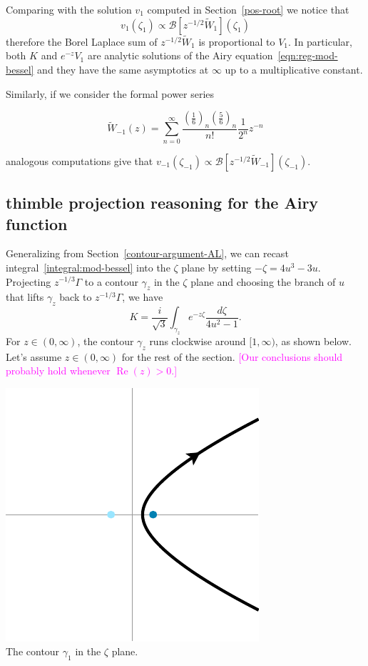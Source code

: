\documentclass{article}
\theoremstyle{definition}
\newcommand{\borel}{\mathcal{B}}
\begin{document}
Comparing with the solution $v_1$ computed in Section~\ref{pos-root} we notice that \[v_1(\zeta_1)\propto \borel\left[z^{-1/2}\tilde{W}_1\right](\zeta_1)\]
therefore the Borel Laplace sum of $z^{-1/2}\tilde{W}_1$ is proportional to $V_1$. In particular, both $K$ and $e^{-z}V_1$ are analytic solutions of the Airy equation~\eqref{eqn:reg-mod-bessel} and they have the same asymptotics at $\infty$ up to a multiplicative constant. 

Similarly, if we consider the formal power series

\begin{equation}
\tilde{W}_{-1}(z)=\sum_{n=0}^{\infty}\frac{\left(\frac{1}{6}\right)_n\left(\frac{5}{6}\right)_n}{n!}\frac{1}{2^n}z^{-n}
\end{equation}

analogous computations give that $v_{-1}(\zeta_{-1})\propto\borel\left[z^{-1/2}\tilde{W}_{-1}\right](\zeta_{-1})$.

\subsection{thimble projection reasoning for the Airy function}\label{contour-argument}
Generalizing from Section~\ref{contour-argument-AL}, we can recast integral~\eqref{integral:mod-bessel} into the $\zeta$ plane by setting $-\zeta = 4u^3 - 3u$. Projecting $z^{-1/3} \Gamma$ to a contour $\gamma_z$ in the $\zeta$ plane and choosing the branch of $u$ that lifts $\gamma_z$ back to $z^{-1/3} \Gamma$, we have
\begin{equation}\label{integral:mod-bessel-zeta}
K = \frac{i}{\sqrt{3}} \int_{\gamma_z} e^{-z\zeta}\frac{d\zeta}{4u^2 - 1}.
\end{equation}
For $z \in (0, \infty)$, the contour $\gamma_z$ runs clockwise around $[1, \infty)$, as shown below. Let's assume $z \in (0, \infty)$ for the rest of the section. \textcolor{magenta}{[Our conclusions should probably hold whenever $\operatorname{Re}(z) > 0$.]}
\begin{center}
\includegraphics{figures/zeta_contour_3.pdf} \\[1em]
{\small The contour $\gamma_1$ in the $\zeta$ plane.}
\end{center}
\end{document}
